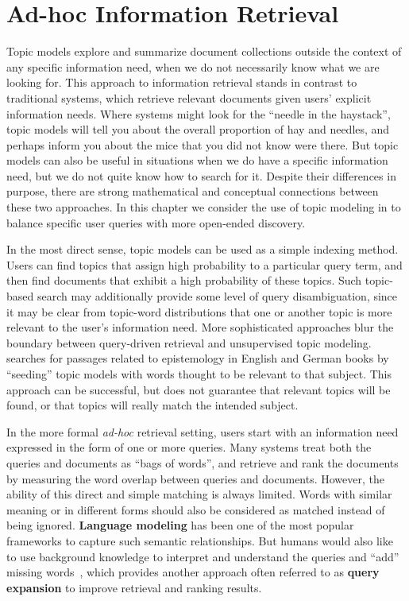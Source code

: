 \chapter{Ad-hoc Information Retrieval}
\label{ch:ir}

Topic models explore and summarize document collections outside the context of any specific information need, when we do not necessarily know what we are looking for.
This approach to information retrieval stands in contrast to traditional  systems, which retrieve relevant documents given users' explicit information needs.
Where  systems might look for the ``needle in the haystack'', topic models will tell you about the overall proportion of hay and needles, and perhaps inform you about the mice that you did not know were there.
But topic models can also be useful in situations when we do have a specific information need, but we do not quite know how to search for it.
Despite their differences in purpose, there are strong mathematical and conceptual connections between these two approaches.
In this chapter we consider the use of topic modeling in  to balance specific user queries with more open-ended discovery.

In the most direct sense, topic models can be used as a simple indexing method.
Users can find topics that assign high probability to a particular query term, and then find documents that exhibit a high probability of these topics.
Such topic-based search may additionally provide some level of query disambiguation, since it may be clear from topic-word distributions that one or another topic is more relevant to the user's information need.
More sophisticated approaches blur the boundary between query-driven retrieval and unsupervised topic modeling.
\citet{erlin2017topic} searches for passages related to epistemology in English and German books by ``seeding'' topic models with words thought to be relevant to that subject.
This approach can be successful, but does not guarantee that relevant topics will be found, or that topics will really match the intended subject.

In the more formal \textit{ad-hoc} retrieval setting, users start with an information need expressed in the form of one or more queries. Many  systems treat both the queries and documents as ``bags of words'', and retrieve and rank the documents by measuring the word overlap between queries and documents.
However, the ability of this direct and simple matching is always
limited. Words with similar meaning or in different forms should also
be considered as matched instead of being ignored. \textbf{Language
  modeling} has been one of the most popular frameworks to capture
such semantic relationships. But humans would also like to use background
knowledge to interpret and understand the queries and ``add'' missing
words~\citep{wei-07}, which provides another approach often referred to as
\textbf{query expansion} to improve retrieval and ranking results.

